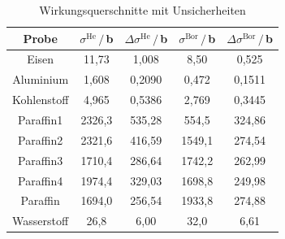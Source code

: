 \documentclass[german, parskip=full]{scrartcl}
\newcommand{\tecxt}{}
\begin{document}
\begin{table}[h!]
\centering
\begin{tabular}{c||c|c||c|c}
Probe&$\sigma^\tecxt\text{He}\,/\,$b&$\Delta\sigma^\tecxt\text{He}\,/\,$b&$\sigma^\tecxt\text{Bor}\,/\,$b&$\Delta\sigma^\tecxt\text{Bor}\,/\,$b\\ \hline
Eisen&	11,73&	1,008&	8,50&	0,525\\ \hline
Aluminium&	1,608	&0,2090&	0,472&	0,1511\\ \hline
Kohlenstoff&	4,965&	0,5386&	2,769&	0,3445\\ \hline
Paraffin1&	2326,3&	535,28&	554,5&	324,86\\ \hline
Paraffin2&	2321,6&	416,59&	1549,1&	274,54\\ \hline
Paraffin3&	1710,4&	286,64&	1742,2&	262,99\\ \hline
Paraffin4&	1974,4&	329,03&	1698,8&	249,98\\ \hline
Paraffin&	1694,0&	256,54&	1933,8&	274,88\\ \hline
Wasserstoff&	26,8&	6,00&	32,0&	6,61\\
\end{tabular}
\caption{Wirkungsquerschnitte mit Unsicherheiten}
\label{table:sigma mit Unsicherheiten}
\end{table}
\end{document}
